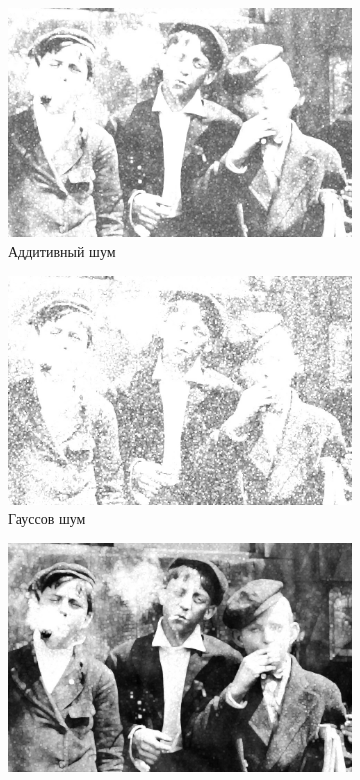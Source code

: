 \begin{figure}[ht!]
\begin{subfigure}[b]{0.5\linewidth}
      \includegraphics[width=0.95\linewidth]{../Rang_Filter/Rang_Additive_noise_(k=5,r=25).jpg} 
      \caption{Аддитивный шум} 
      \label{rang_5_25:c} 
      \vspace{4ex}
    \end{subfigure}%
    \begin{subfigure}[b]{0.5\linewidth}
      \centering
      \includegraphics[width=0.95\linewidth]{../Rang_Filter/Rang_Gaussian_noise_(k=5,r=25).jpg} 
      \caption{Гауссов шум} 
      \label{rang_5_25:d} 
      \vspace{4ex}
    \end{subfigure}
    \begin{subfigure}[b]{0.5\linewidth}
      \centering
      \includegraphics[width=0.95\linewidth]{../Rang_Filter/Rang_Poisson_noise_(k=5,r=25).jpg} 

\end{subfigure}
\end{figure}
